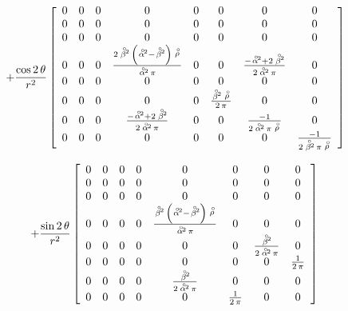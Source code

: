 \begin{figure}
{\begin{minipage} {142.0mm}
\[
+
{{\cos 2\,\theta }\over {{r^2}}}
\left[\begin{array}{cccccccc} 0&0&0&0&0&0&0&0\\ 0&0&0&0&0&0&0&0\\ 0&0&0&0&0&0&0&0\\
   0&0&0&{{2\,{\rf{\beta}\!{}^2}\,\left( {\rf{\alpha}\!{}^2} - {\rf{\beta}\!{}^2} \right) \,
       {\rf{\rho}}}\over {{\rf{\alpha}\!{}^2}\,\pi }}&0&0&
   {{-{\rf{\alpha}\!{}^2} + 2\,{\rf{\beta}\!{}^2}}\over {2\,{\rf{\alpha}\!{}^2}\,\pi }}&0\\
   0&0&0&0&0&0&0&0\\ 0&0&0&0&0&
   {{{\rf{\beta}\!{}^2}\,{\rf{\rho}}}\over {2\,\pi }}&0&0\\
   0&0&0&{{-{\rf{\alpha}\!{}^2} + 2\,{\rf{\beta}\!{}^2}}\over 
     {2\,{\rf{\alpha}\!{}^2}\,\pi }}&0&0&
   {{-1}\over {2\,{\rf{\alpha}\!{}^2}\,\pi \,{\rf{\rho}}}}&0\\
   0&0&0&0&0&0&0&{{-1}\over {2\,{\rf{\beta}\!{}^2}\,\pi \,{\rf{\rho}}}}\end{array}\right]
\]
  
  

\[
+
{{\sin 2\,\theta }\over {{r^2}}}  
\left[\begin{array}{cccccccc} 
0&0&0&0&0&0&0&0\\ 0&0&0&0&0&0&0&0\\ 0&0&0&0&0&0&0&0\\
   0&0&0&0&{{{\rf{\beta}\!{}^2}\,\left( {\rf{\alpha}\!{}^2} - {\rf{\beta}\!{}^2} \right) \,
       {\rf{\rho}}}\over {{\rf{\alpha}\!{}^2}\,\pi }}&0&0&0\\
   0&0&0&0&0&0&{{{\rf{\beta}\!{}^2}}\over {2\,{\rf{\alpha}\!{}^2}\,\pi }}&0\\
   0&0&0&0&0&0&0&{1\over {2\,\pi }}\\
   0&0&0&0&{{{\rf{\beta}\!{}^2}}\over {2\,{\rf{\alpha}\!{}^2}\,\pi }}&0&0&0\\
   0&0&0&0&0&{1\over {2\,\pi }}&0&0\end{array}\right]
\] 
\vspace{3mm}
\end{minipage}
}
\end{figure}

